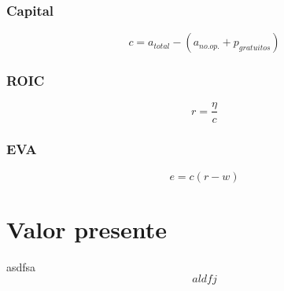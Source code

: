 \begin{multicols}{2}
\subsubsection*{Capital}
\begin{equation}
    c = a_{total} - \left(a_{no.op.} + p_{gratuitos} \right)
\end{equation}

\subsubsection*{ROIC}
\begin{equation}
    r = \frac{\eta}{c}
\end{equation}

\subsubsection*{EVA}
\begin{equation}
    e = c(r-w)
\end{equation}


\section{Valor presente}

asdfsa
\begin{equation}
    aldfj
\end{equation}

\end{multicols}



